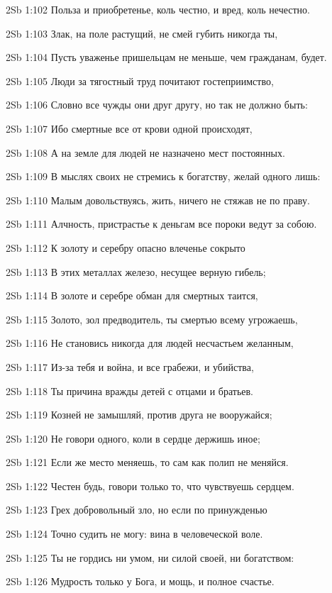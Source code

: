 \vs 2Sb 1:102 Польза и приобретенье, коль честно, и вред, коль нечестно. 

\vs 2Sb 1:103 Злак, на поле растущий, не смей губить никогда ты, 

\vs 2Sb 1:104 Пусть уваженье пришельцам не меньше, чем гражданам, будет.

\vs 2Sb 1:105 Люди за тягостный труд почитают гостеприимство, 

\vs 2Sb 1:106 Словно все чужды они друг другу, но так не должно быть: 

\vs 2Sb 1:107 Ибо смертные все от крови одной происходят, 

\vs 2Sb 1:108 А на земле для людей не назначено мест постоянных. 

\vs 2Sb 1:109 В мыслях своих не стремись к богатству, желай одного лишь:

\vs 2Sb 1:110 Малым довольствуясь, жить, ничего не стяжав не по праву. 

\vs 2Sb 1:111 Алчность, пристрастье к деньгам все пороки ведут за собою. 

\vs 2Sb 1:112 К золоту и серебру опасно влеченье  сокрыто 

\vs 2Sb 1:113 В этих металлах железо, несущее верную гибель; 

\vs 2Sb 1:114 В золоте и серебре обман для смертных таится,

\vs 2Sb 1:115 Золото, зол предводитель, ты смертью всему угрожаешь, 

\vs 2Sb 1:116 Не становись никогда для людей несчастьем желанным, 

\vs 2Sb 1:117 Из-за тебя и война, и все грабежи, и убийства, 

\vs 2Sb 1:118 Ты причина вражды детей с отцами и братьев.

\vs 2Sb 1:119 Козней не замышляй, против друга не вооружайся; 

\vs 2Sb 1:120 Не говори одного, коли в сердце держишь иное;

\vs 2Sb 1:121 Если же место меняешь, то сам как полип не меняйся.

\vs 2Sb 1:122 Честен будь, говори только то, что чувствуешь сердцем.

\vs 2Sb 1:123 Грех добровольный  зло, но если по принужденью 

\vs 2Sb 1:124 Точно судить не могу: вина в человеческой воле. 

\vs 2Sb 1:125 Ты не гордись ни умом, ни силой своей, ни богатством:

\vs 2Sb 1:126 Мудрость только у Бога, и мощь, и полное счастье.

